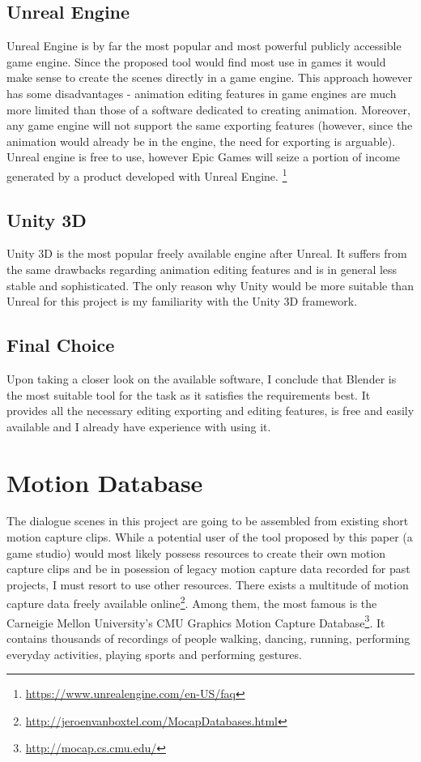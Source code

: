 \subsection{Unreal Engine}

Unreal Engine is by far the most popular and most powerful publicly accessible game engine. Since the proposed tool would find most use in games it would make sense to create the scenes directly in a game engine. This approach however has some disadvantages - animation editing features in game engines are much more limited than those of a software dedicated to creating animation. Moreover, any game engine will not support the same exporting features (however, since the animation would already be in the engine, the need for exporting is arguable). Unreal engine is free to use, however Epic Games will seize a portion of income generated by a product developed with Unreal Engine. \footnote{\url{https://www.unrealengine.com/en-US/faq}}

\subsection{Unity 3D}

Unity 3D is the most popular freely available engine after Unreal. It suffers from the same drawbacks regarding animation editing features and is in general less stable and sophisticated. The only reason why Unity would be more suitable than Unreal for this project is my familiarity with the Unity 3D framework.


\subsection{Final Choice}

Upon taking a closer look on the available software, I conclude that Blender is the most suitable tool for the task as it satisfies the requirements best. It provides all the necessary editing exporting and editing features, is free and easily available and I already have experience with using it.



\section{Motion Database}

The dialogue scenes in this project are going to be assembled from existing short motion capture clips. While a potential user of the tool proposed by this paper (a game studio) would most likely possess resources to create their own motion capture clips and be in posession of legacy motion capture data recorded for past projects, I must resort to use other resources. There exists a multitude of motion capture data freely available online\footnote{\url{http://jeroenvanboxtel.com/MocapDatabases.html}}. Among them, the most famous is the Carneigie Mellon University's CMU Graphics Motion Capture Database\footnote{\url{http://mocap.cs.cmu.edu/}}. It contains thousands of recordings of people walking, dancing, running, performing everyday activities, playing sports and performing gestures.

